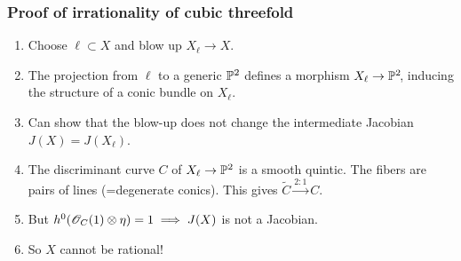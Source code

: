 \begin{frame}
\frametitle{Proof of irrationality of cubic threefold}

\begin{enumerate}[<+->]
	\item Choose $\ell \subset X$ and blow up $X_\ell \to X$.

	\item The projection from $\ell$ to a generic $\P^2$ defines a morphism $X_\ell \to \P^2\mkern-4mu$, inducing the structure of a conic bundle on $X_\ell$.

	\item Can show that the blow-up does not change the intermediate Jacobian $J(X)=J(X_\ell)$.

	\item The discriminant curve $C$ of $X_\ell \to \P^2$ is a smooth quintic. The fibers are pairs of lines (=degenerate conics). This gives $\widetilde C \xrightarrow{2:1} C$.

	\item But $h^0(\OO_C(1) \otimes \eta)=1 \implies J(X)$ is not a Jacobian.

	\item So $X$ cannot be rational!
\end{enumerate}

\end{frame}